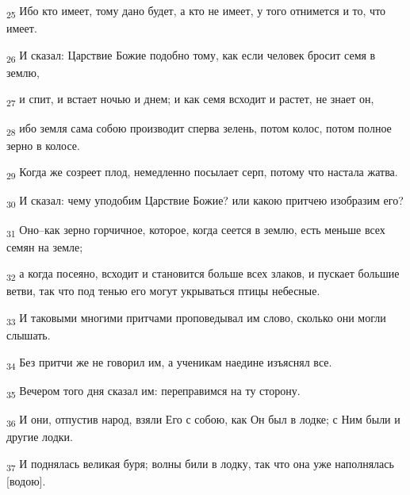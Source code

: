 \begin{tcolorbox}
\textsubscript{25} Ибо кто имеет, тому дано будет, а кто не имеет, у того отнимется и то, что имеет.
\end{tcolorbox}
\begin{tcolorbox}
\textsubscript{26} И сказал: Царствие Божие подобно тому, как если человек бросит семя в землю,
\end{tcolorbox}
\begin{tcolorbox}
\textsubscript{27} и спит, и встает ночью и днем; и как семя всходит и растет, не знает он,
\end{tcolorbox}
\begin{tcolorbox}
\textsubscript{28} ибо земля сама собою производит сперва зелень, потом колос, потом полное зерно в колосе.
\end{tcolorbox}
\begin{tcolorbox}
\textsubscript{29} Когда же созреет плод, немедленно посылает серп, потому что настала жатва.
\end{tcolorbox}
\begin{tcolorbox}
\textsubscript{30} И сказал: чему уподобим Царствие Божие? или какою притчею изобразим его?
\end{tcolorbox}
\begin{tcolorbox}
\textsubscript{31} Оно--как зерно горчичное, которое, когда сеется в землю, есть меньше всех семян на земле;
\end{tcolorbox}
\begin{tcolorbox}
\textsubscript{32} а когда посеяно, всходит и становится больше всех злаков, и пускает большие ветви, так что под тенью его могут укрываться птицы небесные.
\end{tcolorbox}
\begin{tcolorbox}
\textsubscript{33} И таковыми многими притчами проповедывал им слово, сколько они могли слышать.
\end{tcolorbox}
\begin{tcolorbox}
\textsubscript{34} Без притчи же не говорил им, а ученикам наедине изъяснял все.
\end{tcolorbox}
\begin{tcolorbox}
\textsubscript{35} Вечером того дня сказал им: переправимся на ту сторону.
\end{tcolorbox}
\begin{tcolorbox}
\textsubscript{36} И они, отпустив народ, взяли Его с собою, как Он был в лодке; с Ним были и другие лодки.
\end{tcolorbox}
\begin{tcolorbox}
\textsubscript{37} И поднялась великая буря; волны били в лодку, так что она уже наполнялась [водою].
\end{tcolorbox}
